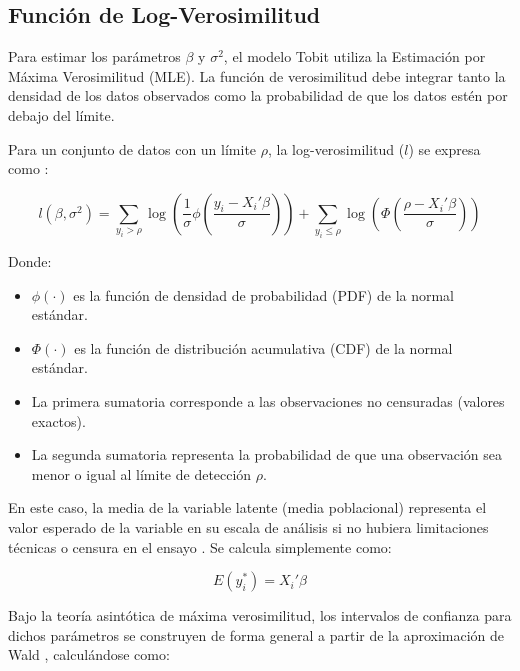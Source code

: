 \subsection{Función de Log-Verosimilitud}

Para estimar los parámetros $\beta$ y $\sigma^2$, el modelo Tobit utiliza la Estimación por Máxima Verosimilitud (MLE). La función de verosimilitud debe integrar tanto la densidad de los datos observados como la probabilidad de que los datos estén por debajo del límite.

Para un conjunto de datos con un límite $\rho$, la log-verosimilitud ($l$) se expresa como \cite{tobit_survey,tobit_original}:

\begin{equation}
	l(\beta, \sigma^2) = \sum_{y_i > \rho} \log \left( \frac{1}{\sigma} \phi \left( \frac{y_i - X_i' \beta}{\sigma} \right) \right) + \sum_{y_i \le \rho} \log \left( \Phi \left( \frac{\rho - X_i' \beta}{\sigma} \right) \right)
	\label{eq:tobit_loglik}
\end{equation}

Donde:
\begin{itemize}
	\item $\phi(\cdot)$ es la función de densidad de probabilidad (PDF) de la normal estándar.
	\item $\Phi(\cdot)$ es la función de distribución acumulativa (CDF) de la normal estándar.
	\item La primera sumatoria corresponde a las observaciones no censuradas (valores exactos).
	\item La segunda sumatoria representa la probabilidad de que una observación sea menor o igual al límite de detección $\rho$.
\end{itemize}

En este caso, la media de la variable latente (media poblacional) representa el valor esperado de la variable en su escala de análisis si no hubiera limitaciones técnicas o censura en el ensayo \cite{tobit_survey}. Se calcula simplemente como:

\begin{equation}
	E(y_i^*) = X_i' \beta
	\label{eq:tobit_media}
\end{equation}

Bajo la teoría asintótica de máxima verosimilitud, los intervalos de confianza para dichos parámetros se construyen de forma general a partir de la aproximación de Wald \cite{wald1943, casella2002statistical}, calculándose como:

